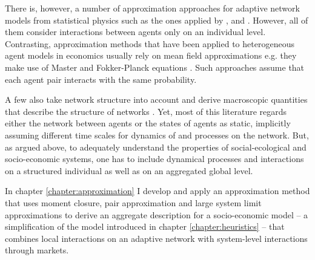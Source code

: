There is, however, a number of approximation approaches for adaptive network models from statistical physics such as the ones applied by \cite{Rogers2013}, \cite{Wiedermann2015} and \cite{Min2017}. However, all of them consider interactions between agents only on an individual level. Contrasting, approximation methods that have been applied to heterogeneous agent models in economics usually rely on mean field approximations e.g. they make use of Master and Fokker-Planck equations \citep{Aoki1998, Aoki2007, DelliGatti2000, DiGuilmi2008, Chiarella2011a, Landini2014}. Such approaches assume that each agent pair interacts with the same probability.

A few also take network structure into account and derive macroscopic quantities that describe the structure of networks \citep[e.g.][]{Alfarano2008a, Lux2016}.
Yet, most of this literature regards either the network between agents or the states of agents as static, implicitly assuming different time scales for dynamics of and processes on the network.
But, as argued above, to adequately understand the properties of social-ecological and socio-economic systems, one has to include dynamical processes and interactions on a structured individual as well as on an aggregated global level.

In chapter \ref{chapter:approximation} I develop and apply an approximation method that uses moment closure, pair approximation and large system limit approximations to derive an aggregate description for a socio-economic model -- a simplification of the model introduced in chapter \ref{chapter:heuristics} -- that combines local interactions on an adaptive network with system-level interactions through markets. 

